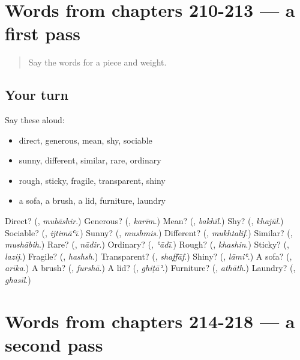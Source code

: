 \section[(dialogue)]{Words from chapters 210-213 — a first pass}

\label{lesson:AR-R218-first-pass-words-from-chapters-210-213}



\begin{quote}
Say the words for a piece and weight.
\end{quote}

\subsection*{Your turn}
Say these aloud:

\begin{itemize}
\raggedright
  \item direct, generous, mean, shy, sociable
  \item sunny, different, similar, rare, ordinary
  \item rough, sticky, fragile, transparent, shiny
  \item a sofa, a brush, a lid, furniture, laundry
\end{itemize}

\begin{tcolorbox}[breakable,colback=teal!4,colframe=teal!35!black,title={Before you move on}]
Direct? (\textbf{}, \emph{mubāshir}.) Generous? (\textbf{}, \emph{karīm}.) Mean? (\textbf{}, \emph{bakhīl}.) Shy? (\textbf{}, \emph{khajūl}.) Sociable? (\textbf{}, \emph{ijtimāʿī}.) Sunny? (\textbf{}, \emph{mushmis}.) Different? (\textbf{}, \emph{mukhtalif}.) Similar? (\textbf{}, \emph{mushābih}.) Rare? (\textbf{}, \emph{nādir}.) Ordinary? (\textbf{}, \emph{ʿādī}.) Rough? (\textbf{}, \emph{khashin}.) Sticky? (\textbf{}, \emph{lazij}.) Fragile? (\textbf{}, \emph{hashsh}.) Transparent? (\textbf{}, \emph{shaffāf}.) Shiny? (\textbf{}, \emph{lāmiʿ}.) A sofa? (\textbf{}, \emph{arīka}.) A brush? (\textbf{}, \emph{furshā}.) A lid? (\textbf{}, \emph{ghiṭāʾ}.) Furniture? (\textbf{}, \emph{athāth}.) Laundry? (\textbf{}, \emph{ghasīl}.)
\end{tcolorbox}
\section[(dialogue)]{Words from chapters 214-218 — a second pass}

